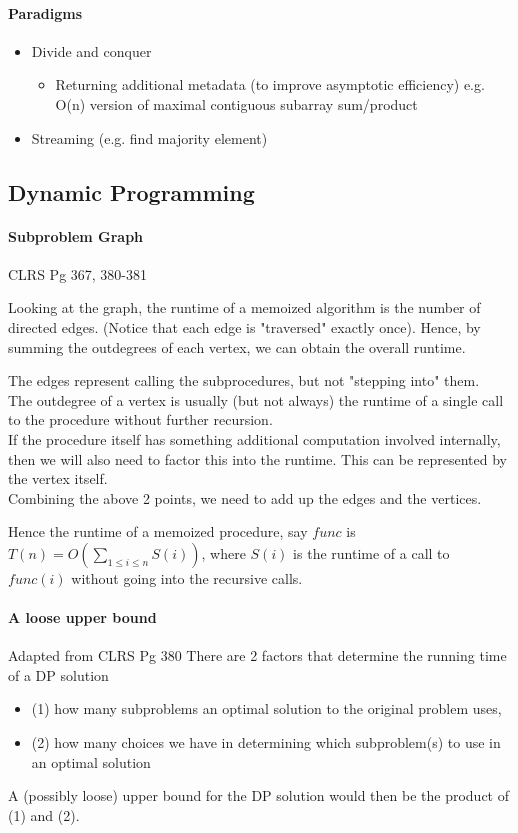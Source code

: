\documentclass{article}
\begin{document}
\paragraph{Paradigms}
\begin{itemize}
	\item Divide and conquer
	\begin{itemize}
		\item Returning additional metadata (to improve asymptotic efficiency) e.g. O(n) version of maximal contiguous subarray sum/product
	\end{itemize}
	\item Streaming (e.g. find majority element)
\end{itemize}


\subsection{Dynamic Programming}
\paragraph{Subproblem Graph} CLRS Pg 367, 380-381

Looking at the graph, the runtime of a memoized algorithm is the number of directed edges. (Notice that each edge is "traversed" exactly once). Hence, by summing the outdegrees of each vertex, we can obtain the overall runtime.


The edges represent calling the subprocedures, but not "stepping into" them.\\
The outdegree of a vertex is usually (but not always) the runtime of a single call to the procedure without further recursion. \\
If the procedure itself has something additional computation involved internally, then we will also need to factor this into the runtime. This can be represented by the vertex itself.\\
Combining the above 2 points, we need to add up the edges and the vertices.

Hence the runtime of a memoized procedure, say $func$ is $T(n) = O(\sum_{1\leq i\leq n}S(i))$, where $S(i)$ is the runtime of a call to $func(i)$ without going into the recursive calls.

\paragraph{A loose upper bound} Adapted from CLRS Pg 380
There are 2 factors that determine the running time of a DP solution
\begin{itemize}
	\item (1) how many subproblems an optimal solution to the original problem uses,
	\item (2) how many choices we have in determining which subproblem(s) to use in an
optimal solution
\end{itemize}

A (possibly loose) upper bound for the DP solution would then be the product of (1) and (2).
\end{document}
